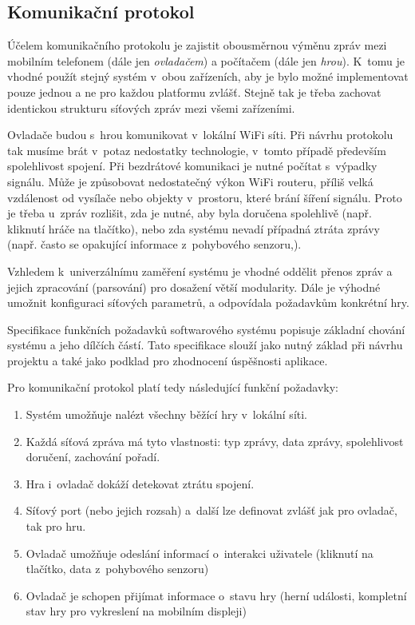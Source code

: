 \documentclass[thesis=B,czech,hidelinks]{FITthesis}[2012/06/26] %
\begin{document}
\subsection{Komunikační protokol}

Účelem komunikačního protokolu je zajistit obousměrnou výměnu zpráv mezi mobilním telefonem (dále jen \textit{ovladačem}) a počítačem (dále jen \textit{hrou}). K~tomu je vhodné použít stejný systém v~obou zařízeních, aby je bylo možné implementovat pouze jednou a ne pro každou platformu zvlášť. Stejně tak je třeba zachovat identickou strukturu síťových zpráv mezi všemi zařízeními.

Ovladače budou s~hrou komunikovat v~lokální WiFi síti. Při návrhu protokolu tak musíme brát v~potaz nedostatky technologie, v~tomto případě především spolehlivost spojení. Při bezdrátové komunikaci je nutné počítat s~výpadky signálu. Může je způsobovat nedostatečný výkon WiFi routeru, příliš velká vzdálenost od vysílače nebo objekty v~prostoru, které brání šíření signálu. Proto je třeba u~zpráv rozlišit, zda je nutné, aby byla doručena spolehlivě (např. kliknutí hráče na tlačítko), nebo zda systému nevadí případná ztráta zprávy (např. často se opakující informace z~pohybového senzoru,). 

Vzhledem k~univerzálnímu zaměření systému je vhodné oddělit přenos zpráv a jejich zpracování (parsování) pro dosažení větší modularity. Dále je výhodné umožnit  konfiguraci síťových parametrů, a odpovídala požadavkům konkrétní hry.

Specifikace funkčních požadavků softwarového systému popisuje základní chování systému a jeho dílčích částí. Tato specifikace slouží jako nutný základ při návrhu projektu a také jako podklad pro zhodnocení úspěšnosti aplikace. \cite{pozadavky}

Pro komunikační protokol platí tedy následující funkční požadavky:

\begin{enumerate}
	\item Systém umožňuje nalézt všechny běžící hry v~lokální síti.
	\item Každá síťová zpráva má tyto vlastnosti: typ zprávy, data zprávy, spolehlivost doručení, zachování pořadí.
	\item Hra i~ovladač dokáží detekovat ztrátu spojení.
	\item Síťový port (nebo jejich rozsah) a~další lze definovat zvlášť jak pro ovladač, tak pro hru.
	\item Ovladač umožňuje odeslání informací o~interakci uživatele (kliknutí na tlačítko, data z~pohybového senzoru)
	\item Ovladač je schopen přijímat informace o~stavu hry (herní události, kompletní stav hry pro vykreslení na mobilním displeji)
\end{enumerate}
\end{document}
